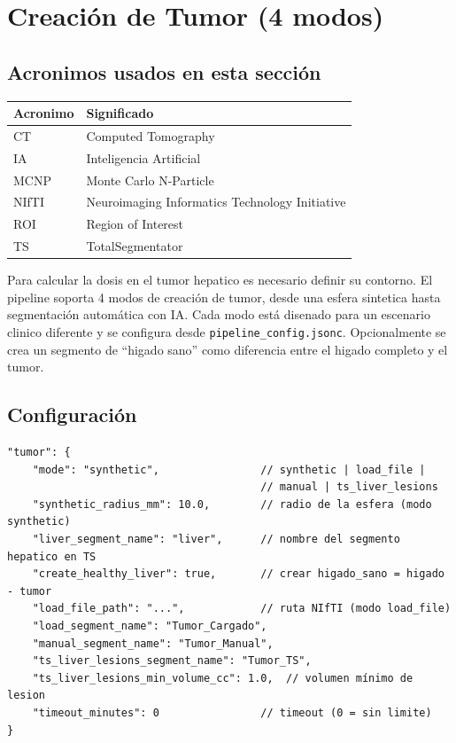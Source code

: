 \documentclass[12pt,a4paper]{article}
\begin{document}
\section{Creación de Tumor (4 modos)}
\label{sec:tumor}

\subsection*{Acronimos usados en esta sección}
\begin{tabular}{ll}
\toprule
\textbf{Acronimo} & \textbf{Significado} \\
\midrule
CT & Computed Tomography \\
IA & Inteligencia Artificial \\
MCNP & Monte Carlo N-Particle \\
NIfTI & Neuroimaging Informatics Technology Initiative \\
ROI & Region of Interest \\
TS & TotalSegmentator \\
\bottomrule
\end{tabular}

Para calcular la dosis en el tumor hepatico es necesario definir su contorno. El pipeline soporta
4 modos de creación de tumor, desde una esfera sintetica hasta segmentación automática con IA.
Cada modo está disenado para un escenario clinico diferente y se configura desde
\texttt{pipeline\_config.jsonc}. Opcionalmente se crea un segmento de ``higado sano'' como
diferencia entre el higado completo y el tumor.

\subsection{Configuración}

\begin{lstlisting}
"tumor": {
    "mode": "synthetic",                // synthetic | load_file |
                                        // manual | ts_liver_lesions
    "synthetic_radius_mm": 10.0,        // radio de la esfera (modo synthetic)
    "liver_segment_name": "liver",      // nombre del segmento hepatico en TS
    "create_healthy_liver": true,       // crear higado_sano = higado - tumor
    "load_file_path": "...",            // ruta NIfTI (modo load_file)
    "load_segment_name": "Tumor_Cargado",
    "manual_segment_name": "Tumor_Manual",
    "ts_liver_lesions_segment_name": "Tumor_TS",
    "ts_liver_lesions_min_volume_cc": 1.0,  // volumen mínimo de lesion
    "timeout_minutes": 0                // timeout (0 = sin limite)
}
\end{lstlisting}
\end{document}

